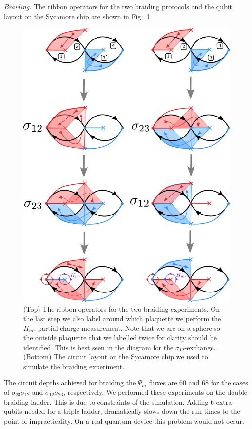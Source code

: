 \documentclass[two column]{article}
\begin{document}
\emph{Braiding.} The ribbon operators for the two braiding protocols and the qubit layout on the Sycamore chip are shown in Fig.~\ref{fig:braiding_setup}.
\begin{figure}
	\centering
	\includegraphics[width=\linewidth]{Figures/braiding_setup.pdf}
	\caption{(Top) The ribbon operators for the two braiding experiments. On the last step we also label around which plaquette we perform the $H_{mr}$-partial charge measurement. Note that we are on a sphere so the outside plaquette that we labelled twice for clarity should be identified. This is best seen in the diagram for the $\sigma_{12}$-exchange. (Bottom) The circuit layout on the Sycamore chip we used to simulate the braiding experiment.}
	\label{fig:braiding_setup}
\end{figure}


The circuit depths achieved for braiding the $\Psi_m$ fluxes are 60 and 68 for the cases of $\sigma_{23}\sigma_{12}$ and $\sigma_{12}\sigma_{23}$, respectively. We performed these experiments on the double braiding ladder. This is due to constraints of the simulation. Adding 6 extra qubits needed for a triple-ladder, dramatically slows down the run times to the point of impracticality. On a real quantum device this problem would not occur.
\end{document}
